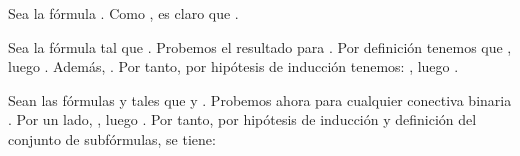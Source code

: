 \begin{isabellebody}
\begin{isamarkuptext}
\begin{demostracion}
    Sea la fórmula \isa{{\isasymbottom}}. Como , es claro que 
    .

    Sea la fórmula  tal que . Probemos el resultado 
    para . Por definición tenemos que 
    , luego . Además, 
    . Por tanto, por hipótesis de 
    inducción tenemos:
    , luego
    .

    Sean las fórmulas  y  tales que  y 
    . Probemos ahora  para cualquier 
    conectiva binaria \isa{{\isacharasterisk}}. Por un lado, 
    , luego 
    . Por tanto, por hipótesis de inducción y definición 
    del conjunto de subfórmulas, se tiene:


\end{demostracion}
\end{isamarkuptext}
\end{isabellebody}
